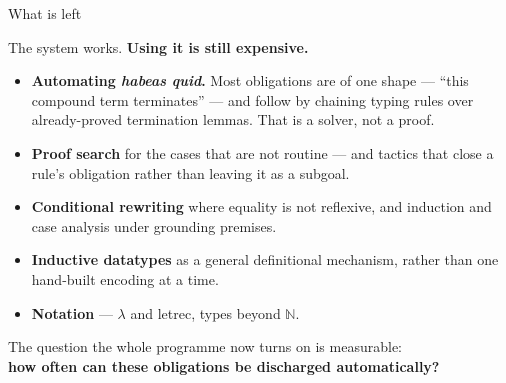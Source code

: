 \documentclass[aspectratio=169,11pt]{beamer}
\newcommand{\hq}{\textit{habeas quid}}
\newcommand{\code}[1]{{\ttfamily\footnotesize #1}}
\newcommand{\key}[1]{{\color{accent}\textbf{#1}}}
\begin{document}
\begin{frame}{What is left}
  \vfill
  \begin{center}\Large
    The system works. \key{Using it is still expensive.}
  \end{center}
  \vfill
  \small
  \begin{itemize}\itemsep0.4em
    \item \key{Automating \hq.} Most obligations are of one shape --- ``this compound
          term terminates'' --- and follow by chaining typing rules over already-proved
          termination lemmas. That is a solver, not a proof.
    \item \key{Proof search} for the cases that are not routine --- and tactics that
          close a rule's obligation rather than leaving it as a subgoal.
    \item \key{Conditional rewriting} where equality is not reflexive, and induction
          and case analysis under grounding premises.
    \item \key{Inductive datatypes} as a general definitional mechanism, rather than
          one hand-built encoding at a time.
    \item \key{Notation} --- $\lambda$ and \code{letrec}, types beyond $\mathbb{N}$.
  \end{itemize}
  \vfill
  \pause
  \begin{center}
    The question the whole programme now turns on is measurable:\\[0.3em]
    \key{how often can these obligations be discharged automatically?}
  \end{center}
  \vfill
\end{frame}
\end{document}

